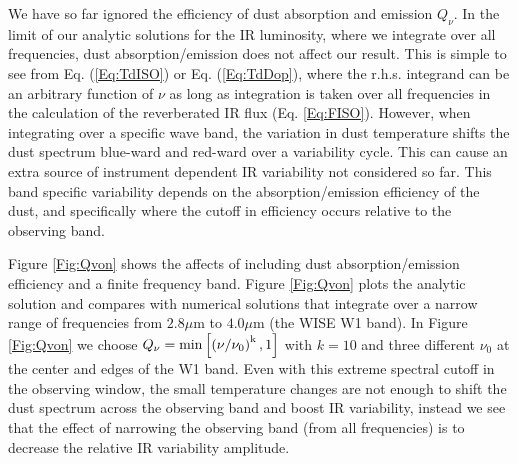 We have so far ignored the efficiency of dust absorption and emission
$Q_{\nu}$. In the limit of our analytic solutions for the IR luminosity, where
we integrate over all frequencies, dust absorption/emission does not affect
our result. This is simple to see from Eq. (\ref{Eq:TdISO}) or Eq.
(\ref{Eq:TdDop}), where the r.h.s. integrand can be an arbitrary function of
$\nu$ as long as integration is taken over all frequencies in the calculation
of the reverberated IR flux (Eq. \ref{Eq:FISO}). However, when integrating
over a specific wave band, the variation in dust temperature shifts the dust
spectrum blue-ward and red-ward over a variability cycle. This can cause an
extra source of instrument dependent IR variability not considered so far.
This band specific variability depends on the absorption/emission efficiency
of the dust, and specifically where the cutoff in efficiency occurs relative
to the observing band.

Figure \ref{Fig:Qvon} shows the affects of including dust absorption/emission
efficiency and a finite frequency band. Figure \ref{Fig:Qvon} plots the
analytic solution and compares with numerical solutions that integrate over a
narrow range of frequencies from $2.8\mu$m to $4.0\mu$m (the WISE W1 band). In
Figure \ref{Fig:Qvon}  we choose $Q_{\nu} = \rm{min}\left[ \left( \nu/ \nu_0
\right)^{k}, 1\right]$ with $k=10$ and three different $\nu_0$ at the center
and edges of the W1 band. Even with this extreme spectral cutoff in the
observing window, the small temperature changes are not enough to shift the
dust spectrum across the observing band and boost IR variability, instead we
see that the effect of narrowing the observing band (from all frequencies) is
to decrease the relative IR variability amplitude.







